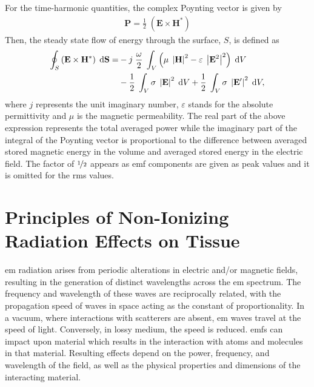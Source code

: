 For the time-harmonic quantities, the complex Poynting vector is given by
\begin{align}
    \mathbf{P} = \frac{1}{2} \; \left( \mathbf{E} \times \mathbf{H}^* \right)
\end{align}
Then, the steady state flow of energy through the surface, $S$, is defined as
\begin{align}
    \oint_S \left( \mathbf{E} \times \mathbf{H}^* \right) \; \mathrm{d} \mathbf{S} = &-j \; \frac{\omega}{2} \; \int_V \left( \mu \; \left| \mathbf{H} \right|^2 - \varepsilon \; \left| \mathbf{E}^2 \right|^2 \right) \; \mathrm{d}V \\ \notag
    &- \frac{1}{2} \; \int_V \sigma \; \left| \mathbf{E} \right|^2 \; \mathrm{d}V + \frac{1}{2} \; \int_V \sigma \; \left| \mathbf{E}' \right|^2 \; \mathrm{d}V,
\end{align}
where $j$ represents the unit imaginary number, $\varepsilon$ stands for the absolute permittivity and $\mu$ is the magnetic permeability.
The real part of the above expression represents the total averaged power while the imaginary part of the integral of the Poynting vector is proportional to the difference between averaged stored magnetic energy in the volume and averaged stored energy in the electric field.
The factor of $\nicefrac{1}{2}$ appears as \gls{emf} components are given as peak values and it is omitted for the \gls{rms} values.

\section{Principles of Non-Ionizing Radiation Effects on Tissue}
\gls{em} radiation arises from periodic alterations in electric and/or magnetic fields, resulting in the generation of distinct wavelengths across the \gls{em} spectrum.
The frequency and wavelength of these waves are reciprocally related, with the propagation speed of waves in space acting as the constant of proportionality.
In a vacuum, where interactions with scatterers are absent, \gls{em} waves travel at the speed of light.
Conversely, in lossy medium, the speed is reduced.
\Gls{emf}s can impact upon material which results in the interaction with atoms and molecules in that material.
Resulting effects depend on the power, frequency, and wavelength of the field, as well as the physical properties and dimensions of the interacting material.

